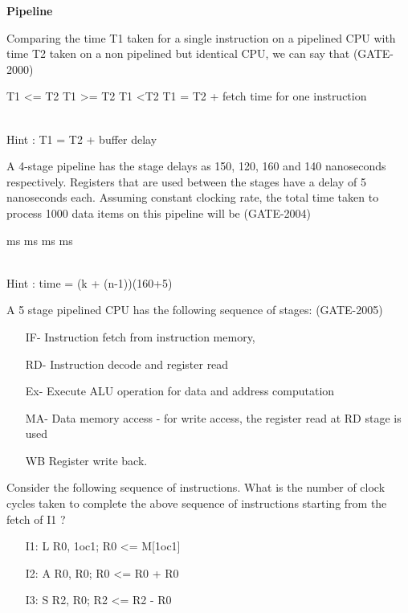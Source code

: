 
\centerline{\textbf{ \LARGE Pipeline }}


\begin{questyle}
  \question  Comparing the time T1 taken for a single instruction on a pipelined CPU with time
            T2 taken on a non­ pipelined but identical CPU, we can say that  (GATE-2000)

  \begin{oneparchoices}
    \choice         T1 \textless= T2
    \CorrectChoice  T1 \textgreater= T2
    \choice         T1 \textless T2
    \choice         T1 = T2 + fetch time for one instruction
  \end{oneparchoices}
  \\ Hint : T1 = T2 + buffer delay
\end{questyle}


\begin{questyle}
  \question  A 4-stage pipeline has the stage delays as 150, 120, 160 and 140 nanoseconds respectively.
            Registers that are used between the stages have a delay of 5 nanoseconds each. Assuming
            constant clocking rate, the total time taken to process 1000 data items on this pipeline will be  (GATE-2004)

  \begin{oneparchoices}
     ms
     ms
     ms
     ms
  \end{oneparchoices}
  \\ Hint : time = (k + (n-1))(160+5)
\end{questyle}


\begin{questyle}
  \question  A 5 stage pipelined CPU has the following sequence of stages:  (GATE-2005)
  \begin{enumerate}
    \item[IF-] Instruction fetch from instruction memory,
    \item[RD-] Instruction decode and register read
    \item[Ex-] Execute ALU operation for data and address computation
    \item[MA-] Data memory access - for write access, the register read
     at RD stage is used
     \item[WB] Register write back.
  \end{enumerate}
  Consider the following sequence of instructions. What is the number of clock cycles taken to complete the above sequence of instructions starting from the fetch of I1 ?
  \begin{enumerate}
    \item[I1:]  L R0, 1oc1; R0 <= M[1oc1]
    \item[I2:]  A R0, R0;  R0 <= R0 + R0
    \item[I3:]  S R2, R0;  R2 <= R2 - R0
  \end{enumerate}

  \begin{oneparchoices}
  \end{oneparchoices}
\end{questyle}

